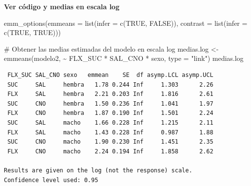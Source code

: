 \documentclass[
  letterpaper,
  DIV=11,
  numbers=noendperiod]{scrartcl}
\newenvironment{Shaded}{\begin{snugshade}}{\end{snugshade}}
\newcommand{\AttributeTok}[1]{\textcolor[rgb]{0.40,0.45,0.13}{#1}}
\newcommand{\CommentTok}[1]{\textcolor[rgb]{0.37,0.37,0.37}{#1}}
\newcommand{\ConstantTok}[1]{\textcolor[rgb]{0.56,0.35,0.01}{#1}}
\newcommand{\FunctionTok}[1]{\textcolor[rgb]{0.28,0.35,0.67}{#1}}
\newcommand{\NormalTok}[1]{\textcolor[rgb]{0.00,0.23,0.31}{#1}}
\newcommand{\OtherTok}[1]{\textcolor[rgb]{0.00,0.23,0.31}{#1}}
\newcommand{\SpecialCharTok}[1]{\textcolor[rgb]{0.37,0.37,0.37}{#1}}
\newcommand{\StringTok}[1]{\textcolor[rgb]{0.13,0.47,0.30}{#1}}
\begin{document}
\begin{tcolorbox}[enhanced jigsaw, arc=.35mm, bottomrule=.15mm, breakable, colback=white, colframe=quarto-callout-note-color-frame, left=2mm, leftrule=.75mm, opacityback=0, rightrule=.15mm, toprule=.15mm]
\begin{minipage}[t]{5.5mm}
\textcolor{quarto-callout-note-color}{\faInfo}
\end{minipage}%
\begin{minipage}[t]{\textwidth - 5.5mm}

\vspace{-3mm}\textbf{Ver código y medias en escala log}\vspace{3mm}

\begin{Shaded}
\begin{Highlighting}[]
\FunctionTok{emm\_options}\NormalTok{(}\AttributeTok{emmeans =} \FunctionTok{list}\NormalTok{(}\AttributeTok{infer =} \FunctionTok{c}\NormalTok{(}\ConstantTok{TRUE}\NormalTok{, }\ConstantTok{FALSE}\NormalTok{)),}
            \AttributeTok{contrast =} \FunctionTok{list}\NormalTok{(}\AttributeTok{infer =} \FunctionTok{c}\NormalTok{(}\ConstantTok{TRUE}\NormalTok{, }\ConstantTok{TRUE}\NormalTok{)))}

\CommentTok{\# Obtener las medias estimadas del modelo en escala log}
\NormalTok{medias.log }\OtherTok{\textless{}{-}} \FunctionTok{emmeans}\NormalTok{(modelo2, }\SpecialCharTok{\textasciitilde{}}\NormalTok{ FLX\_SUC }\SpecialCharTok{*}\NormalTok{ SAL\_CNO }\SpecialCharTok{*}\NormalTok{ sexo, }\AttributeTok{type =} \StringTok{"link"}\NormalTok{)}
\NormalTok{medias.log}
\end{Highlighting}
\end{Shaded}

\begin{verbatim}
 FLX_SUC SAL_CNO sexo   emmean    SE  df asymp.LCL asymp.UCL
 SUC     SAL     hembra   1.78 0.244 Inf     1.303      2.26
 FLX     SAL     hembra   2.21 0.203 Inf     1.816      2.61
 SUC     CNO     hembra   1.50 0.236 Inf     1.041      1.97
 FLX     CNO     hembra   1.87 0.190 Inf     1.501      2.24
 SUC     SAL     macho    1.66 0.228 Inf     1.215      2.11
 FLX     SAL     macho    1.43 0.228 Inf     0.987      1.88
 SUC     CNO     macho    1.90 0.230 Inf     1.451      2.35
 FLX     CNO     macho    2.24 0.194 Inf     1.858      2.62

Results are given on the log (not the response) scale. 
Confidence level used: 0.95 
\end{verbatim}

\end{minipage}%
\end{tcolorbox}
\end{document}

